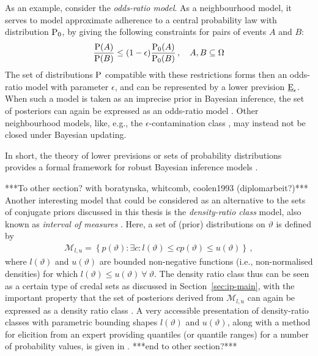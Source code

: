 As an example, consider the \emph{odds-ratio model}.
As a neighbourhood model,
it serves to model approximate adherence to a central probability law with distribution $\operatorname{P}_0$,
by giving the following constraints for pairs of events $A$ and $B$:
\begin{align*}
\frac{\operatorname{P}(A)}{\operatorname{P}(B)} \le (1-\epsilon)\frac{\operatorname{P}_0(A)}{\operatorname{P}_0(B)}\,,\quad A, B \subseteq \Omega
\end{align*}
The set of distributions $\operatorname{P}$ compatible with these restrictions
forms then an odds-ratio model with parameter $\epsilon$,
and can be represented by a lower prevision $\underline{\operatorname{E}}_\epsilon$.
When such a model is taken as an imprecise prior in Bayesian inference,
the set of posteriors can again be expressed as an odds-ratio model
\parencite[\S 7.2]{itip-special}.
Other neighbourhood models, like, e.g., the $\epsilon$-contamination class
\parencite[see, e.g.,][\S 4.3.2]{1994:berger},
may instead not be closed under Bayesian updating.

In short, the theory of lower previsions or sets of probability distributions
provides a formal framework for robust Bayesian inference models
\parencite{1994:berger}.

***To other section? with boratynska, whitcomb, coolen1993 (diplomarbeit?)***\\
Another interesting model that could be considered
as an alternative to the sets of conjugate priors discussed in this thesis
is the \emph{density-ratio class} model,
also known as \emph{interval of measures}
\parencites{1981:derobertis}{1990:berger}.
Here, a set of (prior) distributions on $\vartheta$ is defined by %
\begin{align*}
\mathcal{M}_{l,u} = \left\{ p(\vartheta) :
\exists c: l(\vartheta) \le c p(\vartheta) \le u(\vartheta)\right\}\,,
\end{align*}
where $l(\vartheta)$ and $u(\vartheta)$ are bounded non-negative functions (i.e., non-normalised densities)	
for which $l(\vartheta) \le u(\vartheta)\ \forall\ \vartheta$.
The density ratio class thus can be seen as a certain type of credal sets as discussed in Section~\ref{sec:ip-main},
with the important property that the set of posteriors derived from $\mathcal{M}_{l,u}$
can again be expressed as a density ratio class \parencite{1981:derobertis}.
A very accessible presentation of density-ratio classes with
parametric bounding shapes $l(\vartheta)$ and $u(\vartheta)$,
along with a method for elicition from an expert
providing quantiles (or quantile ranges) for a number of probability values,
is given in \cite{2011:rinderknecht}.
***end to other section?***





